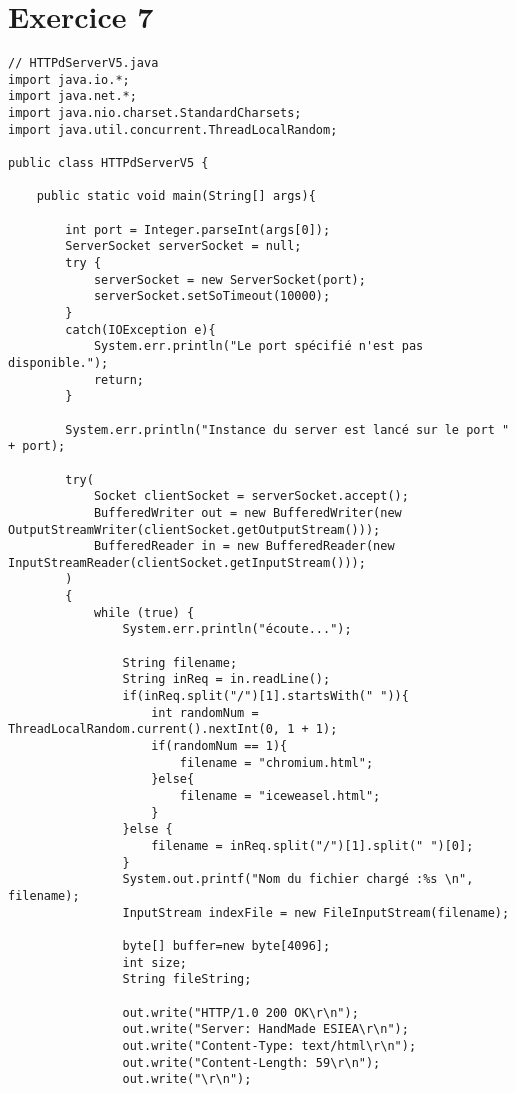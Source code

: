 \documentclass{article}
\begin{document}
\section*{Exercice 7}
\begin{lstlisting}
// HTTPdServerV5.java
import java.io.*;
import java.net.*;
import java.nio.charset.StandardCharsets;
import java.util.concurrent.ThreadLocalRandom;

public class HTTPdServerV5 {

    public static void main(String[] args){

        int port = Integer.parseInt(args[0]);
        ServerSocket serverSocket = null;
        try {
            serverSocket = new ServerSocket(port);
            serverSocket.setSoTimeout(10000);
        }
        catch(IOException e){
            System.err.println("Le port spécifié n'est pas disponible.");
            return;
        }
        
        System.err.println("Instance du server est lancé sur le port " + port);
    
        try(
            Socket clientSocket = serverSocket.accept();
            BufferedWriter out = new BufferedWriter(new OutputStreamWriter(clientSocket.getOutputStream()));
            BufferedReader in = new BufferedReader(new InputStreamReader(clientSocket.getInputStream()));
        )
        {
            while (true) {       
                System.err.println("écoute...");

                String filename;
                String inReq = in.readLine();
                if(inReq.split("/")[1].startsWith(" ")){
                    int randomNum = ThreadLocalRandom.current().nextInt(0, 1 + 1);
                    if(randomNum == 1){
                        filename = "chromium.html";
                    }else{
                        filename = "iceweasel.html";
                    }
                }else {
                    filename = inReq.split("/")[1].split(" ")[0];     
                }
                System.out.printf("Nom du fichier chargé :%s \n", filename);          
                InputStream indexFile = new FileInputStream(filename);

                byte[] buffer=new byte[4096];
                int size;
                String fileString;

                out.write("HTTP/1.0 200 OK\r\n");
                out.write("Server: HandMade ESIEA\r\n");
                out.write("Content-Type: text/html\r\n");
                out.write("Content-Length: 59\r\n");
                out.write("\r\n");


\end{lstlisting}
\end{document}
